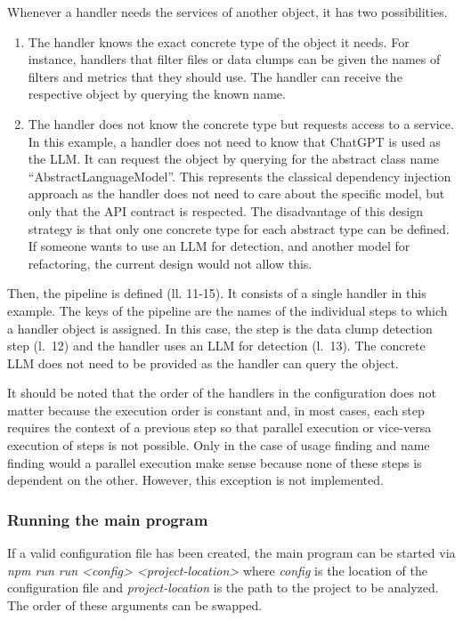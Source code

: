 Whenever a handler needs the services of another object, it has two possibilities.
\begin{enumerate}
    \item The handler knows the exact concrete type of the object it needs. For instance, handlers that filter files or data clumps can be given the names of filters and metrics that they should use. The handler can receive the respective object by querying the known name. 

    \item The handler does not know the concrete type but requests access to a service. In this example, a handler does not need to know that ChatGPT is used as the \ac{LLM}. It can request the object by querying for the abstract class name \enquote{AbstractLanguageModel}. This represents the classical dependency injection approach as the handler does not need to care about the specific model, but only that the \ac{API} contract is respected. The disadvantage of this design strategy is that only one  concrete type for each abstract type can be defined. If someone wants to use an \ac{LLM} for detection, and another model for refactoring, the current design would not allow this. 
\end{enumerate}




Then, the pipeline is defined (ll. 11-15). It consists of a single handler in this example. The keys of the pipeline are the names of the individual steps to which a handler object is assigned. In this case, the step is the data clump detection step (l.~12) and the  handler uses an \ac{LLM} for detection (l.~13). The concrete \ac{LLM} does not need to be provided as the handler can query the object. 


It should be noted that the order of the handlers in the configuration  does not matter because the execution order is constant and, in most cases, each step requires the context of a previous step so that parallel execution or vice-versa execution of steps is not possible. Only in the case of usage finding and name finding would a parallel execution make sense because none of these steps is dependent on the other.  However, this exception is not implemented.


\subsubsection{Running the main program}


If a valid configuration file has been created, the main program can be started via \textit{npm run run <config> <project-location>} where \textit{config} is the location of the configuration file and \textit{project-location} is the path to the project to be analyzed. The order of these arguments can be swapped. 

